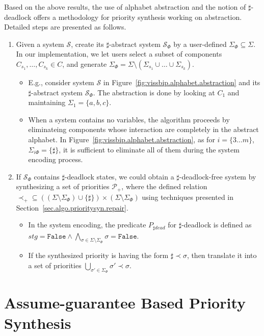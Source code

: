 \documentclass[10pt, a4paper, onecolumn, conference, compsocconf]{IEEEtran}
\newcommand{\sys}{\mathcal{S}}
\newcommand{\pri}{\mathcal{P}}
\newcommand{\false}{\texttt{False}}
\begin{document}
 Based on the above results, the use of alphabet abstraction and the notion of $\sharp$-deadlock offers a methodology for priority synthesis working on abstraction. Detailed steps are presented as follows.
\begin{enumerate}
 \item Given a system $\sys$, create its $\sharp$-abstract system $\sys_{\Phi}$ by a user-defined $\Sigma_{\Phi} \subseteq \Sigma$. In our implementation, we let users select a subset of components $C_{s_1},\ldots, C_{s_k}\in C$, and generate $\Sigma_{\Phi} = \Sigma\setminus(\Sigma_{s_1}\cup\ldots\cup\Sigma_{s_k})$.
     \begin{itemize}
        \item E.g., consider system $\mathcal{S}$ in Figure~\ref{fig:vissbip.alphabet.abstraction} and its $\sharp$-abstract system $\sys_{\Phi}$. The abstraction is done by looking at $C_{1}$ and maintaining $\Sigma_1 =\{a,b,c\}$.
        \item When a system contains no variables, the algorithm proceeds by eliminateing components whose interaction are completely in the abstract alphabet. In Figure~\ref{fig:vissbip.alphabet.abstraction}, as for $i= \{3\ldots m\}$, $\Sigma_{i\Phi} = \{\sharp\}$, it is sufficient to eliminate all of them during the system encoding process.
    \end{itemize}
\item  If $\sys_{\Phi}$ contains $\sharp$-deadlock states, we could obtain a $\sharp$-deadlock-free system by synthesizing a set of priorities $\pri_{+}$, where the defined relation $\prec_{+} \subseteq ((\Sigma\setminus\Sigma_{\Phi})\cup \{\sharp\})\times (\Sigma\setminus\Sigma_{\Phi})$ using techniques presented in Section~\ref{sec.algo.prioritysyn.repair}.
    \begin{itemize}
        \item In the system encoding, the predicate $P_{\sharp dead}$ for $\sharp$-deadlock is defined as $stg=\false \wedge \bigwedge_{\sigma \in \Sigma\setminus\Sigma_{\Phi}} \sigma =\false$.
        \item If the synthesized priority is having the form $\sharp \prec \sigma$, then translate it into a set of priorities $\bigcup_{\sigma' \in \Sigma_{\Phi}} \sigma' \prec \sigma$.
    \end{itemize}

\end{enumerate}

\section{Assume-guarantee Based Priority Synthesis\label{sec.algo.prioritysyn.assume.guarantee}}
\end{document}
